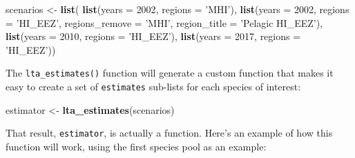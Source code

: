 \documentclass[
]{book}
\newenvironment{Shaded}{\begin{snugshade}}{\end{snugshade}}
\newcommand{\DataTypeTok}[1]{\textcolor[rgb]{0.13,0.29,0.53}{#1}}
\newcommand{\DecValTok}[1]{\textcolor[rgb]{0.00,0.00,0.81}{#1}}
\newcommand{\KeywordTok}[1]{\textcolor[rgb]{0.13,0.29,0.53}{\textbf{#1}}}
\newcommand{\NormalTok}[1]{#1}
\newcommand{\StringTok}[1]{\textcolor[rgb]{0.31,0.60,0.02}{#1}}
\begin{document}
\begin{Shaded}
\begin{Highlighting}[]
\NormalTok{scenarios <-}\StringTok{ }\KeywordTok{list}\NormalTok{(}
    \KeywordTok{list}\NormalTok{(}\DataTypeTok{years =} \DecValTok{2002}\NormalTok{,}
       \DataTypeTok{regions =} \StringTok{'MHI'}\NormalTok{),}
    \KeywordTok{list}\NormalTok{(}\DataTypeTok{years =} \DecValTok{2002}\NormalTok{, }
         \DataTypeTok{regions =} \StringTok{'HI_EEZ'}\NormalTok{,}
         \DataTypeTok{regions_remove =} \StringTok{'MHI'}\NormalTok{,}
         \DataTypeTok{region_title =} \StringTok{'Pelagic HI_EEZ'}\NormalTok{),}
    \KeywordTok{list}\NormalTok{(}\DataTypeTok{years =} \DecValTok{2010}\NormalTok{,}
         \DataTypeTok{regions =} \StringTok{'HI_EEZ'}\NormalTok{),}
    \KeywordTok{list}\NormalTok{(}\DataTypeTok{years =} \DecValTok{2017}\NormalTok{,}
         \DataTypeTok{regions =} \StringTok{'HI_EEZ'}\NormalTok{))}
\end{Highlighting}
\end{Shaded}

The \texttt{lta\_estimates()} function will generate a custom function that makes it easy to create a set of \texttt{estimates} sub-lists for each species of interest:

\begin{Shaded}
\begin{Highlighting}[]
\NormalTok{estimator <-}\StringTok{ }\KeywordTok{lta_estimates}\NormalTok{(scenarios)}
\end{Highlighting}
\end{Shaded}

That result, \texttt{estimator}, is actually a function. Here's an example of how this function will work, using the first species pool as an example:
\end{document}
